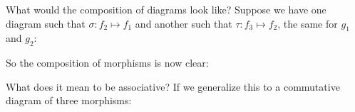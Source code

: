 \documentclass{report}
\begin{document}
\begin{examples}
\begin{example}[\label{exm:1.3.9}]
            What would the composition of diagrams look like? Suppose we have one diagram such that $\sigma : f_{2} \mapsto f_{1}$ and another such that $\tau : f_{3} \mapsto f_{2}$, the same for $g_{1}$ and $g_{2}$:
            \begin{center}
            \end{center}
            So the composition of morphisms is now clear:
            \begin{center}
            \end{center}
            What does it mean to be associative? If we generalize this to a commutative diagram of three morphisms:

\end{example}
\end{examples}
\end{document}
